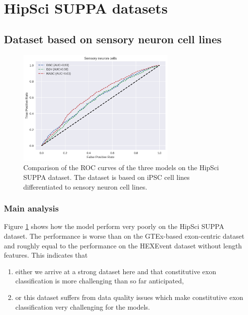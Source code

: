 


\section{HipSci SUPPA datasets} \label{subsec:hipsci_suppa}
\subsection{Dataset based on sensory neuron cell lines}

\begin{figure}
	\centering\includegraphics[width=0.7\textwidth]{../visualizations/ch5-results/suppa_cross_model_roc_auc_comparison.png} 
	\caption{Comparison of the ROC curves of the three models on the HipSci SUPPA dataset. The dataset is based on iPSC cell lines differentiated to sensory neuron cell lines. }
	\label{fig:suppa_auc_roc}
\end{figure}
\subsubsection{Main analysis}
Figure \ref{fig:suppa_auc_roc} shows how the model perform very poorly on the HipSci SUPPA dataset. The performance is worse than on the GTEx-based exon-centric dataset and roughly equal to the performance on the HEXEvent dataset without length features. This indicates that 
\begin{enumerate}
	\item either we arrive at a strong dataset here and that constitutive exon classification is more challenging than so far anticipated,
	\item or this dataset suffers from data quality issues which make constitutive exon classification very challenging for the models.
\end{enumerate}

